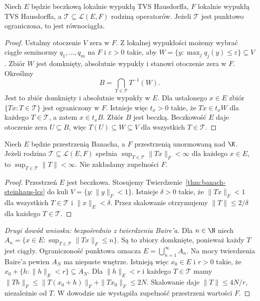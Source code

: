 \begin{twierdzenie}
\label{thm:banach-steinhaus-lcs}
Niech $E$ będzie beczkową lokalnie wypukłą TVS Hausdorffa,
$F$ lokalnie wypukłą TVS Hausdorffa, a
$\mathcal T\subseteq\mathcal L(E,F)$ rodziną operatorów.
Jeżeli $\mathcal T$ jest punktowo ograniczona, to jest
równociągła.
\end{twierdzenie}
\begin{proof}
Ustalmy otoczenie $V$ zera w $F$. Z lokalnej wypukłości
możemy wybrać ciągłe seminormy $q_1,\ldots,q_m$ na $F$
i $\varepsilon>0$ takie, aby
$W=\{y:\max_jq_j(y)\le\varepsilon\}\subseteq V$.
Zbiór $W$ jest domknięty, absolutnie wypukły i stanowi
otoczenie zera w $F$. Określmy
\[
 B=\bigcap_{T\in\mathcal T}T^{-1}(W).
\]
Jest to zbiór domknięty i absolutnie wypukły w $E$.
Dla ustalonego $x\in E$ zbiór $\{Tx:T\in\mathcal T\}$
jest ograniczony w $F$. Istnieje więc $t_x>0$ takie,
że $Tx\in t_x W$ dla każdego $T\in\mathcal T$,
a zatem $x\in t_xB$. Zbiór $B$ jest beczką.
Beczkowość $E$ daje otoczenie zera $U\subseteq B$,
więc $T(U)\subseteq W\subseteq V$ dla wszystkich
$T\in\mathcal T$.
\end{proof}

\begin{wniosek}
\label{cor:uniform-boundedness}
Niech $E$ będzie przestrzenią Banacha, a $F$ przestrzenią
unormowaną nad $\K$. Jeżeli rodzina
$\mathcal T\subseteq\mathcal L(E,F)$ spełnia
$\sup_{T\in\mathcal T}\|Tx\|_F<\infty$ dla każdego
$x\in E$, to $\sup_{T\in\mathcal T}\|T\|<\infty$.
Nie zakładamy zupełności $F$.
\end{wniosek}
\begin{proof}
Przestrzeń $E$ jest beczkowa. Stosujemy
Twierdzenie~\ref{thm:banach-steinhaus-lcs} do kuli
$V=\{y:\|y\|_F<1\}$. Istnieje $\delta>0$ takie, że
$\|Tx\|_F<1$ dla wszystkich $T\in\mathcal T$
i $\|x\|_E<\delta$. Przez skalowanie otrzymujemy
$\|T\|\le 2/\delta$ dla każdego $T\in\mathcal T$.
\end{proof}

\begin{proof}[Drugi dowód wniosku: bezpośrednio z twierdzenia Baire'a]
Dla $n\in\N$ niech
$A_n=\{x\in E:\sup_{T\in\mathcal T}\|Tx\|_F\le n\}$.
Są to zbiory domknięte, ponieważ każdy $T$ jest ciągły.
Ograniczoność punktowa oznacza
$E=\bigcup_{n=1}^\infty A_n$. Na mocy twierdzenia Baire'a
pewien $A_N$ ma niepuste wnętrze. Istnieją więc
$x_0\in E$ i $r>0$ takie, że
$x_0+\{h:\|h\|_E<r\}\subseteq A_N$.
Dla $\|h\|_E<r$ i każdego $T\in\mathcal T$ mamy
$\|Th\|_F\le\|T(x_0+h)\|_F+\|Tx_0\|_F\le2N$.
Skalowanie daje $\|T\|\le4N/r$, niezależnie od $T$.
W dowodzie nie wystąpiła zupełność przestrzeni wartości $F$.
\end{proof}


